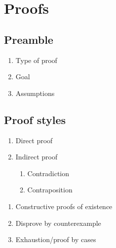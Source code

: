 \documentclass[12pt]{article}
\begin{document}
\section*{Proofs}

\subsection*{Preamble}

\begin{enumerate}
    \item Type of proof
    \item Goal
    \item Assumptions
\end{enumerate}

\subsection*{Proof styles}

\begin{enumerate}
    \item Direct proof
    \item Indirect proof
    \begin{enumerate}
        \item Contradiction
        \item Contraposition
    \end{enumerate}
\end{enumerate}

\begin{enumerate}
    \item Constructive proofs of existence
    \item Disprove by counterexample
    \item Exhaustion/proof by cases
\end{enumerate}
\end{document}
